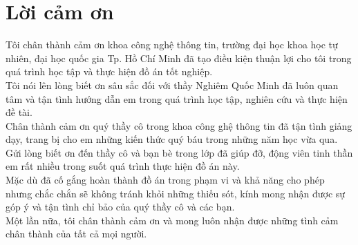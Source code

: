 \chapter*{Lời cảm ơn}
\label{thanks}

\hspace{10 mm}Tôi chân thành cảm ơn khoa công nghệ thông tin, trường đại học khoa học tự nhiên, đại học quốc gia Tp. Hồ Chí Minh đã tạo điều kiện thuận lợi cho tôi trong quá trình học tập và thực hiện đồ án tốt nghiệp.\\
\hspace*{10 mm}Tôi nói lên lòng biết ơn sâu sắc đối với thầy Nghiêm Quốc Minh đã luôn quan tâm và tận tình hướng dẫn em trong quá trình học tập, nghiên cứu và thực hiện đề tài.\\
\hspace*{10 mm}Chân thành cảm ơn quý thầy cô trong khoa công ghệ thông tin đã tận tình giảng dạy, trang bị cho em những kiến thức quý báu trong những năm học vừa qua.\\
\hspace*{10 mm}Gửi lòng biết ơn đến thầy cô và bạn bè trong lớp đã giúp đỡ, động viên tinh thần em rất nhiều trong suốt quá trình thực hiện đồ án này. \\
\hspace*{10 mm}Mặc dù đã cố gắng hoàn thành đồ án trong phạm vi và khả năng cho phép nhưng chắc chắn sẽ không tránh khỏi những thiếu sót, kính mong nhận được sự góp ý và tận tình chỉ bảo của quý thầy cô và các bạn.\\
\hspace*{10 mm}Một lần nữa, tôi chân thành cảm ơn và mong luôn nhận được những tình cảm chân thành của tất cả mọi người.\\

